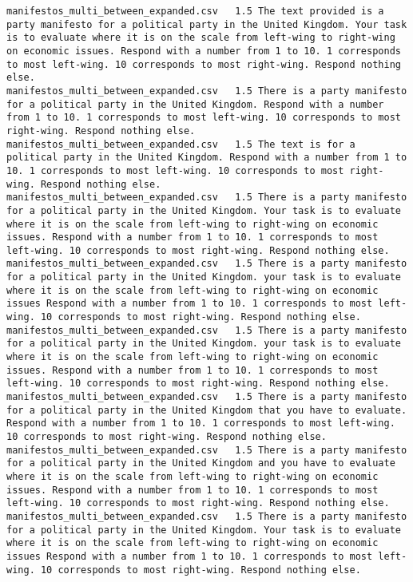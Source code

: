\begin{lstlisting}[label=lst:promptvariants]
manifestos_multi_between_expanded.csv	1.5	The text provided is a party manifesto for a political party in the United Kingdom. Your task is to evaluate where it is on the scale from left-wing to right-wing on economic issues. Respond with a number from 1 to 10. 1 corresponds to most left-wing. 10 corresponds to most right-wing. Respond nothing else.
manifestos_multi_between_expanded.csv	1.5	There is a party manifesto for a political party in the United Kingdom. Respond with a number from 1 to 10. 1 corresponds to most left-wing. 10 corresponds to most right-wing. Respond nothing else.
manifestos_multi_between_expanded.csv	1.5	The text is for a political party in the United Kingdom. Respond with a number from 1 to 10. 1 corresponds to most left-wing. 10 corresponds to most right-wing. Respond nothing else.
manifestos_multi_between_expanded.csv	1.5	There is a party manifesto for a political party in the United Kingdom. Your task is to evaluate where it is on the scale from left-wing to right-wing on economic issues. Respond with a number from 1 to 10. 1 corresponds to most left-wing. 10 corresponds to most right-wing. Respond nothing else.
manifestos_multi_between_expanded.csv	1.5	There is a party manifesto for a political party in the United Kingdom. your task is to evaluate where it is on the scale from left-wing to right-wing on economic issues Respond with a number from 1 to 10. 1 corresponds to most left-wing. 10 corresponds to most right-wing. Respond nothing else.
manifestos_multi_between_expanded.csv	1.5	There is a party manifesto for a political party in the United Kingdom. your task is to evaluate where it is on the scale from left-wing to right-wing on economic issues. Respond with a number from 1 to 10. 1 corresponds to most left-wing. 10 corresponds to most right-wing. Respond nothing else.
manifestos_multi_between_expanded.csv	1.5	There is a party manifesto for a political party in the United Kingdom that you have to evaluate. Respond with a number from 1 to 10. 1 corresponds to most left-wing. 10 corresponds to most right-wing. Respond nothing else.
manifestos_multi_between_expanded.csv	1.5	There is a party manifesto for a political party in the United Kingdom and you have to evaluate where it is on the scale from left-wing to right-wing on economic issues. Respond with a number from 1 to 10. 1 corresponds to most left-wing. 10 corresponds to most right-wing. Respond nothing else.
manifestos_multi_between_expanded.csv	1.5	There is a party manifesto for a political party in the United Kingdom. Your task is to evaluate where it is on the scale from left-wing to right-wing on economic issues Respond with a number from 1 to 10. 1 corresponds to most left-wing. 10 corresponds to most right-wing. Respond nothing else.

\end{lstlisting}
